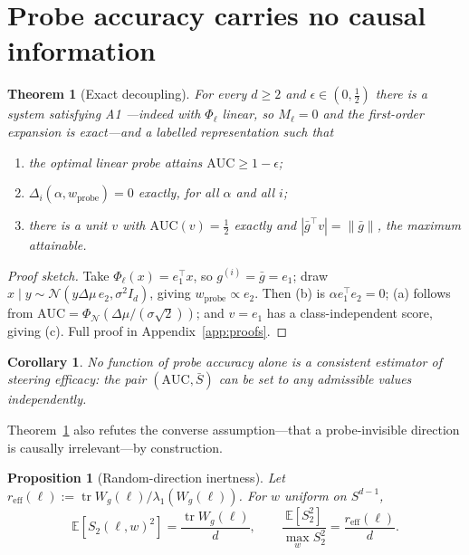 \documentclass[11pt]{article}
\newtheorem{theorem}{Theorem}
\newtheorem{proposition}{Proposition}
\newtheorem{corollary}{Corollary}
\theoremstyle{definition}
\theoremstyle{remark}
\newcommand{\Sbar}{\bar{S}}
\newcommand{\gbar}{\bar{g}}
\newcommand{\Wg}{W_{g}}
\newcommand{\reff}{r_{\mathrm{eff}}}
\begin{document}
\section{Probe accuracy carries no causal information}

\begin{theorem}[Exact decoupling]
\label{thm:decouple}
For every $d\ge2$ and $\epsilon\in(0,\tfrac12)$ there is a system satisfying A1
---indeed with $\Phi_\ell$ linear, so $M_\ell=0$ and the first-order expansion is
exact---and a labelled representation such that
\begin{enumerate}[label=(\alph*),leftmargin=2em,itemsep=0pt]
  \item the optimal linear probe attains $\mathrm{AUC}\ge1-\epsilon$;
  \item $\Delta_i(\alpha,w_{\mathrm{probe}})=0$ \emph{exactly}, for all $\alpha$ and all $i$;
  \item there is a unit $v$ with $\mathrm{AUC}(v)=\tfrac12$ exactly and
  $|\gbar^\top v|=\|\gbar\|$, the maximum attainable.
\end{enumerate}
\end{theorem}

\begin{proof}[Proof sketch]
Take $\Phi_\ell(x)=e_1^\top x$, so $g^{(i)}=\gbar=e_1$; draw
$x\mid y\sim\mathcal{N}(y\Delta\mu\, e_2,\sigma^2 I_d)$, giving
$w_{\mathrm{probe}}\propto e_2$. Then (b) is
$\alpha e_1^\top e_2 = 0$; (a) follows from
$\mathrm{AUC}=\Phi_{\mathcal N}(\Delta\mu/(\sigma\sqrt2))$; and $v=e_1$ has a
class-independent score, giving (c). Full proof in Appendix~\ref{app:proofs}.
\end{proof}

\begin{corollary}
\label{cor:noinfo}
No function of probe accuracy alone is a consistent estimator of steering
efficacy: the pair $(\mathrm{AUC},\Sbar)$ can be set to any admissible values
independently.
\end{corollary}

Theorem~\ref{thm:decouple} also refutes the converse assumption---that a
probe-invisible direction is causally irrelevant---by construction.

\begin{proposition}[Random-direction inertness]
\label{prop:inert}
Let $\reff(\ell) := \operatorname{tr}\Wg(\ell)/\lambda_1(\Wg(\ell))$. For $w$
uniform on $S^{d-1}$,
\begin{equation}
\mathbb{E}\!\left[S_2(\ell,w)^2\right] = \frac{\operatorname{tr}\Wg(\ell)}{d},
\qquad
\frac{\mathbb{E}[S_2^2]}{\max_w S_2^2} = \frac{\reff(\ell)}{d}.
\end{equation}
\end{proposition}
\end{document}
